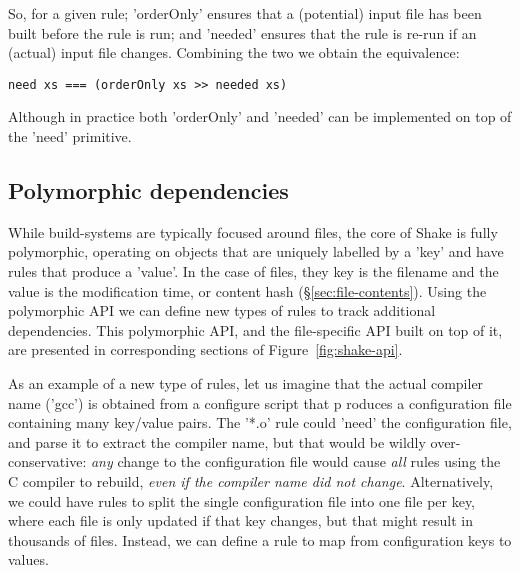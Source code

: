 So, for a given rule; \lst'orderOnly' ensures that a (potential) input
file has been built before the rule is run; and \lst'needed' ensures
that the rule is re-run if an (actual) input file changes. Combining
the two we obtain the equivalence:

\begin{lstlisting}
need xs === (orderOnly xs >> needed xs)
\end{lstlisting}

\noindent Although in practice both \lst'orderOnly' and \lst'needed' can be
implemented on top of the \lst'need' primitive.

\subsection{Polymorphic dependencies\label{sec:polymorphic}}

While build-systems are typically focused around files, the core of Shake is
fully polymorphic, operating on objects that are uniquely labelled by a
\lst'key' and have rules that produce a \lst'value'.
In the case of files, they key is the filename and the value is the modification 
time, or content hash (\S\ref{sec:file-contents}).
Using the polymorphic API we can define new types of rules to track additional
dependencies.
This polymorphic API, and the file-specific API built on top
of it, are presented in corresponding sections of Figure~\ref{fig:shake-api}.

As an example of a new type of rules, let us imagine that the actual compiler
name (\lst'gcc') is obtained from a configure script that p
roduces a
configuration file containing many key/value pairs. The \lst'*.o' rule could
\lst'need' the configuration file, and parse it to extract the compiler name,
but that would be wildly over-conservative: \emph{any} change to the
configuration file would cause \emph{all} rules using the C compiler to rebuild, 
\emph{even if the compiler name did not change}. Alternatively, we could have rules to split
the single configuration file into one file per key, where each file is only
updated if that key changes, but that might result in thousands of files.
Instead, we can define a rule to map from configuration keys to values.

